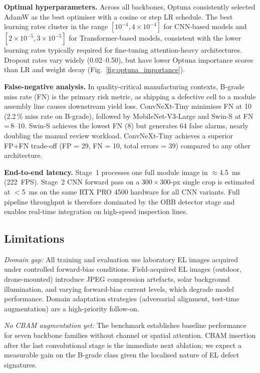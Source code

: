 \documentclass[conference]{IEEEtran}
\begin{document}
\textbf{Optimal hyperparameters.} Across all backbones, Optuna consistently selected AdamW as the best optimiser with a cosine or step LR schedule. The best learning rates cluster in the range $[10^{-4}, 4\times10^{-4}]$ for CNN-based models and $[2\times10^{-5}, 3\times10^{-5}]$ for Transformer-based models, consistent with the lower learning rates typically required for fine-tuning attention-heavy architectures. Dropout rates vary widely (0.02--0.50), but have lower Optuna importance scores than LR and weight decay (Fig.~\ref{fig:optuna_importance}).

\textbf{False-negative analysis.} In quality-critical manufacturing contexts, B-grade miss rate (FN) is the primary risk metric, as shipping a defective cell to a module assembly line causes downstream yield loss. ConvNeXt-Tiny minimises FN at 10 (2.2\,\% miss rate on B-grade), followed by MobileNet-V3-Large and Swin-S at FN\,=\,8--10. Swin-S achieves the lowest FN (8) but generates 64 false alarms, nearly doubling the manual review workload. ConvNeXt-Tiny achieves a superior FP+FN trade-off (FP = 29, FN = 10, total errors = 39) compared to any other architecture.

\textbf{End-to-end latency.} Stage~1 processes one full module image in $\approx$4.5~ms (222~FPS). Stage~2 CNN forward pass on a $300\times300$-px single crop is estimated at $<$5~ms on the same RTX PRO 4500 hardware for all CNN variants. Full pipeline throughput is therefore dominated by the OBB detector stage and enables real-time integration on high-speed inspection lines.

\subsection{Limitations}

\textit{Domain gap:} All training and evaluation use laboratory EL images acquired under controlled forward-bias conditions. Field-acquired EL images (outdoor, drone-mounted) introduce JPEG compression artefacts, solar background illumination, and varying forward-bias current levels, which degrade model performance. Domain adaptation strategies (adversarial alignment, test-time augmentation) are a high-priority follow-on.

\textit{No CBAM augmentation yet:} The benchmark establishes baseline performance for seven backbone families without channel or spatial attention. CBAM insertion after the last convolutional stage is the immediate next ablation; we expect a measurable gain on the B-grade class given the localised nature of EL defect signatures.
\end{document}
